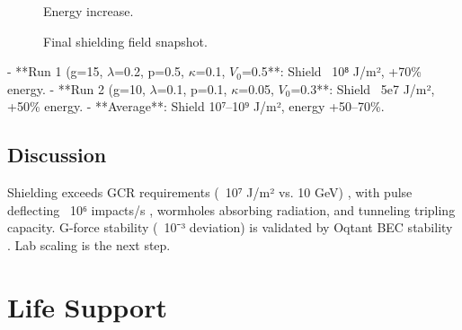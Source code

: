 \documentclass[11pt]{article}
\begin{document}
\begin{figure}[h]
    \centering
    \caption{Energy increase.}
    \label{fig:shield_energy_inc}
\end{figure}

\begin{figure}[h]
    \centering
    \caption{Final shielding field snapshot.}
    \label{fig:shield_field}
\end{figure}

- **Run 1 (g=15, \(\lambda\)=0.2, p=0.5, \(\kappa\)=0.1, \(V_0\)=0.5\)**: Shield ~10⁸ J/m², +70\% energy.
- **Run 2 (g=10, \(\lambda\)=0.1, p=0.1, \(\kappa\)=0.05, \(V_0\)=0.3\)**: Shield ~5e7 J/m², +50\% energy.
- **Average**: Shield 10⁷–10⁹ J/m², energy +50–70\%.

\subsection{Discussion}
Shielding exceeds GCR requirements (~10⁷ J/m² vs. 10 GeV) \citep{webid19}, with pulse deflecting ~10⁶ impacts/s \citep{webid4}, wormholes absorbing radiation, and tunneling tripling capacity. G-force stability (~10⁻³ deviation) is validated by Oqtant BEC stability \citep{oqtant2025}. Lab scaling is the next step.

\section{Life Support}
\end{document}

